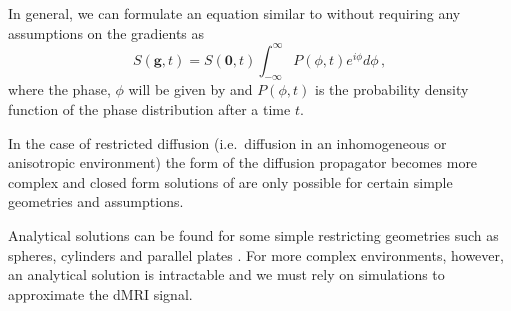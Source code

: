 In general, we can formulate an equation similar to  without requiring any assumptions on the gradients as \cite{Price1997,Hall2009}
\begin{equation}
  S(\mathbf{g}, t) = S(\mathbf{0}, t) \int_{-\infty}^{\infty} P(\phi, t) e^{i\phi} d\phi\,,
  \label{eq:sig_phi_complex}
\end{equation}
where the phase, $\phi$ will be given by  and $P(\phi, t)$ is the probability density function of the phase distribution after a time $t$.

In the case of restricted diffusion (i.e.\ diffusion in an inhomogeneous or anisotropic environment) the form of the diffusion propagator becomes more complex and closed form solutions of  are only possible for certain simple geometries and assumptions.

Analytical solutions can be found for some simple restricting geometries such as spheres, cylinders and parallel plates \cite{Neuman1974, Balinov1993,Callaghan1995}.
For more complex environments, however, an analytical solution is intractable and we must rely on simulations to approximate the \acl{dMRI} signal.  

